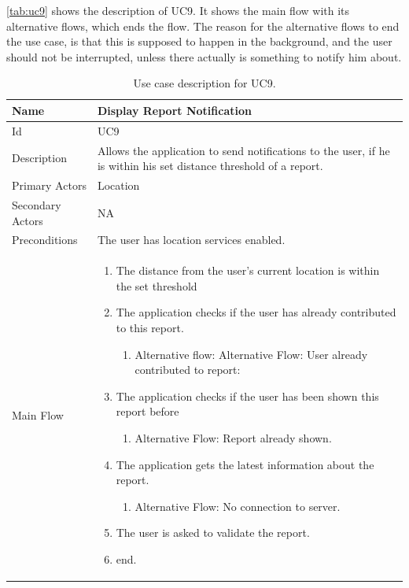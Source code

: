 \autoref{tab:uc9} shows the description of UC9. It shows the main flow with its alternative flows, which ends the flow. The reason for the alternative flows to end the use case, is that this is supposed to happen in the background, and the user should not be interrupted, unless there actually is something to notify him about.
\begin{table}[htb]
\caption{Use case description for UC9.}\label{tab:uc9}
\begin{tabularx}{\textwidth}{|l|X|}
\hline
Name              & Display Report Notification \\ \hline 
Id                & UC9 \\ \hline
Description       & Allows the application to send notifications to the user, if he is within his set distance threshold of a report. \\ \hline
Primary Actors    & Location \\ \hline
Secondary Actors  & NA \\ \hline
Preconditions     & The user has location services enabled. \\ \hline
Main Flow         &
{\footnotesize \begin{enumerate}
\item The distance from the user’s current location is within the set threshold
\item The application checks if the user has already contributed to this report.
\begin{enumerate}
\item Alternative flow: Alternative Flow: User already contributed to report:
\end{enumerate}
\item The application checks if the user has been shown this report before
\begin{enumerate}
\item Alternative Flow: Report already shown.
\end{enumerate}
\item The application gets the latest information about the report.
\begin{enumerate}
\item Alternative Flow: No connection to server.
\end{enumerate}
\item The user is asked to validate the report.
\item end.
\end{enumerate}} \\ \hline

\end{tabularx}
\end{table}
